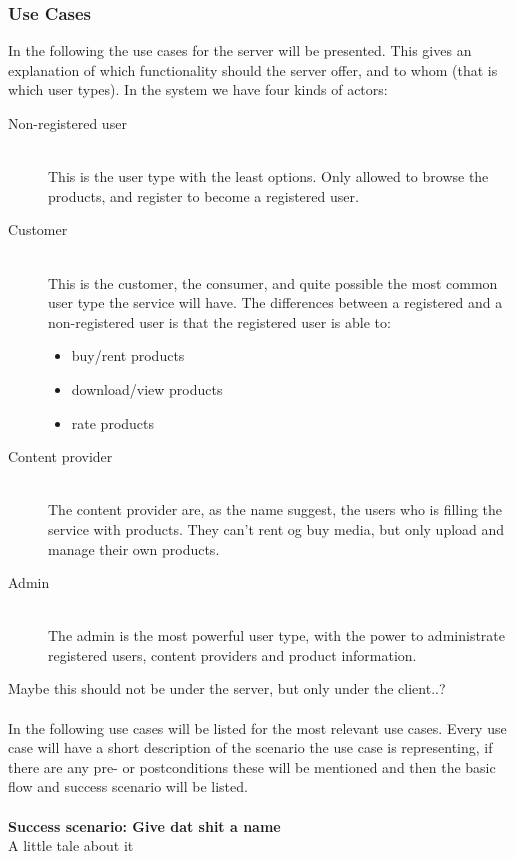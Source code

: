 \subsubsection{Use Cases}
In the following the use cases for the server will be presented. This gives an explanation of which functionality should the server offer, and to whom (that is which user types).
\label{s_actor-goal-list}
In the system we have four kinds of actors:
\begin{description}
	\item [Non-registered user] \hfill \\
		This is the user type with the least options. Only allowed to browse the products, and register to become a registered user.
	\item [Customer]  \hfill \\
		This is the customer, the consumer, and quite possible the most common user type the service will have. The differences between a registered and a non-registered user is that the registered user is able to:
		\begin{itemize}
			\item buy/rent products
			\item download/view products
			\item rate products
		\end{itemize}
	\item [Content provider] \hfill \\
		The content provider are, as the name suggest, the users who is filling the service with products. They can't rent og buy media, but only upload and manage their own products.
	\item [Admin] \hfill \\
		The admin is the most powerful user type, with the power to administrate registered users, content providers and product information.
\end{description}


Maybe this should not be under the server, but only under the client..?\\\\
In the following use cases will be listed for the most relevant use cases. Every use case will have a short description of the scenario the use case is representing, if there are any pre- or postconditions these will be mentioned and then the basic flow and success scenario will be listed.
\\\\
\textbf{Success scenario: Give dat shit a name} \\
A little tale about it


